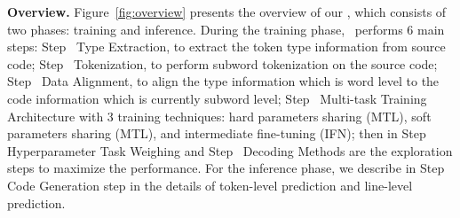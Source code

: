 


\textbf{Overview.} Figure~\ref{fig:overview} presents the overview of our \our, which consists of two phases: training and inference.
During the training phase, \our~performs 6 main steps:
Step~ Type Extraction, to extract the token type information from source code;
Step~ Tokenization, to perform subword tokenization on the source code;
Step~ Data Alignment, to align the type information which is word level to the code information which is currently subword level;
Step~ Multi-task Training Architecture with 3 training techniques: hard parameters sharing (MTL), soft parameters sharing (MTL), and intermediate fine-tuning (IFN);
then in Step~ Hyperparameter Task Weighing and Step~ Decoding Methods are the exploration steps to maximize the performance.
For the inference phase, we describe in Step~ Code Generation step in the details of token-level prediction and line-level prediction.

